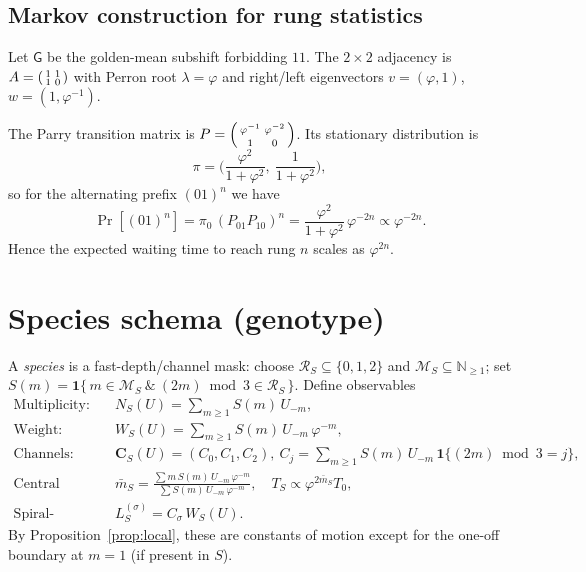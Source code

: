 \documentclass[11pt]{article}
\theoremstyle{remark}
\begin{document}
\subsection*{Markov construction for rung statistics}
Let $\mathsf G$ be the golden-mean subshift forbidding $11$.
The $2\times 2$ adjacency is $A=\begin{psmallmatrix}1&1\\1&0\end{psmallmatrix}$ with Perron root $\lambda=\varphi$ and right/left eigenvectors $v=(\varphi,1)$, $w=(1,\varphi^{-1})$.

The Parry transition matrix is
$P=\begin{psmallmatrix}\varphi^{-1} & \varphi^{-2}\\[2pt] 1 & 0\end{psmallmatrix}$.
Its stationary distribution is
\[
\pi=\Big(\frac{\varphi^2}{1+\varphi^2},\ \frac{1}{1+\varphi^2}\Big),
\]
so for the alternating prefix $(01)^n$ we have
\[
\Pr[(01)^n]=\pi_0\,(P_{01}P_{10})^{n}
=\frac{\varphi^2}{1+\varphi^2}\,\varphi^{-2n}\propto \varphi^{-2n}.
\]
Hence the expected waiting time to reach rung $n$ scales as $\varphi^{2n}$.

\section{Species schema (genotype)}\label{sec:species}
A \emph{species} is a fast-depth/channel mask: choose $\mathcal R_S\subseteq\{0,1,2\}$ and $\mathcal M_S\subseteq\mathbb N_{\ge1}$; set
\(
S(m)=\mathbf 1\{\,m\in\mathcal M_S\ \&\ (2m)\bmod3\in\mathcal R_S\,\}.
\)
Define observables
\begin{align}
\text{Multiplicity:}&\quad N_S(U)=\sum_{m\ge1} S(m)\,U_{-m},\\
\text{Weight:}&\quad W_S(U)=\sum_{m\ge1} S(m)\,U_{-m}\,\varphi^{-m},\\
\text{Channels:}&\quad \mathbf C_S(U)=(C_0,C_1,C_2),\ C_j=\sum_{m\ge1} S(m)\,U_{-m}\,\mathbf 1\{(2m)\bmod3=j\},\\
\text{Central depth/time-scale:}&\quad \bar m_S=\frac{\sum m\,S(m)\,U_{-m}\,\varphi^{-m}}{\sum S(m)\,U_{-m}\,\varphi^{-m}},\quad
T_S\propto \varphi^{2\bar m_S}T_0,\\
\text{Spiral-action:}&\quad L_S^{(\sigma)}=C_\sigma\,W_S(U).
\end{align}
By Proposition~\ref{prop:local}, these are constants of motion except for the one-off boundary at $m{=}1$ (if present in $S$).
\end{document}
